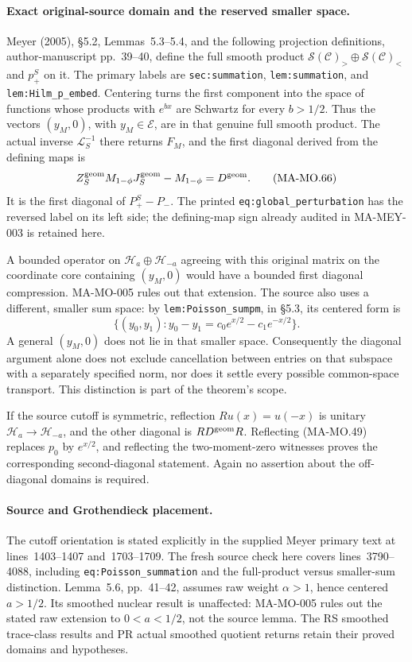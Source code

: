 \paragraph{Exact original-source domain and the reserved smaller space.}
Meyer (2005), \S5.2, Lemmas~5.3--5.4, and the following
projection definitions, author-manuscript pp.~39--40,
define the full smooth product
\(\mathcal S(\mathcal C)_{>}\oplus\mathcal S(\mathcal C)_{<}\)
and \(p_+^S\) on it. The primary labels are
\texttt{sec:summation}, \texttt{lem:summation}, and
\texttt{lem:Hilm\_p\_embed}. Centering turns the first
component into the space of functions whose products with
\(e^{bx}\) are Schwartz for every \(b>1/2\). Thus the
vectors \((y_M,0)\), with \(y_M\in\mathcal E\), are in
that genuine full smooth product. The actual inverse
\(\mathcal L_S^{-1}\) there returns \(F_M\), and the
first diagonal derived from the defining maps is
\[
       Z_S^{\rm geom}M_{1-\phi}J_S^{\rm geom}-M_{1-\phi}
                         =D^{\rm geom}.
 \tag{MA-MO.66}
\]
It is the first diagonal of \(P_+^S-P_-\). The printed
\texttt{eq:global\_perturbation} has the reversed label on
its left side; the defining-map sign already audited in
MA-MEY-003 is retained here.

A bounded operator on \(\mathcal H_a\oplus\mathcal H_{-a}\)
agreeing with this original matrix on the coordinate core
containing \((y_M,0)\) would have a bounded first diagonal
compression. MA-MO-005 rules out that extension. The source
also uses a different, smaller sum space: by
\texttt{lem:Poisson\_sumpm}, in \S5.3, its centered form is
\[
 \{(y_0,y_1):y_0-y_1=c_0e^{x/2}-c_1e^{-x/2}\}.
 \tag{MA-MO.67}
\]
A general \((y_M,0)\) does not lie in that smaller space.
Consequently the diagonal argument alone does not exclude
cancellation between entries on that subspace with a separately
specified norm, nor does it settle every possible common-space
transport. This distinction is part of the theorem's scope.

If the source cutoff is symmetric, reflection \(Ru(x)=u(-x)\)
is unitary \(\mathcal H_a\to\mathcal H_{-a}\), and the other
diagonal is \(RD^{\rm geom}R\). Reflecting (MA-MO.49) replaces
\(p_0\) by \(e^{x/2}\), and reflecting the two-moment-zero
witnesses proves the corresponding second-diagonal statement.
Again no assertion about the off-diagonal domains is required.

\paragraph{Source and Grothendieck placement.}
The cutoff orientation is stated explicitly in the supplied
Meyer primary text at lines~1403--1407 and~1703--1709.
The fresh source check here covers lines~3790--4088, including
\texttt{eq:Poisson\_summation} and the full-product versus
smaller-sum distinction. Lemma~5.6, pp.~41--42, assumes raw
weight \(\alpha>1\), hence centered \(a>1/2\). Its smoothed
nuclear result is unaffected: MA-MO-005 rules out the stated
raw extension to \(0<a<1/2\), not the source lemma.
The RS smoothed trace-class results and PR actual smoothed
quotient returns retain their proved domains and hypotheses.

